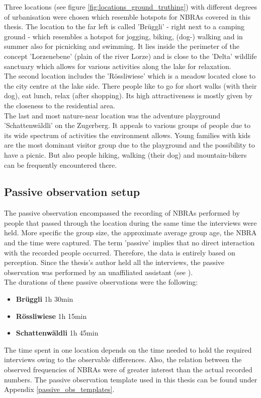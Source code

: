 Three locations (see figure \ref{fig:locations_ground_truthing}) with different degrees of urbanisation were chosen which resemble hotspots for NBRAs covered in this thesis. The location to the far left is called 'Br\"uggli' - right next to a camping ground - which resembles a hotspot for jogging, biking, (dog-) walking and in summer also for picnicking and swimming. It lies inside the perimeter of the concept 'Lorzenebene' (plain of the river Lorze) and is close to the 'Delta' wildlife sanctuary which allows for various activities along the lake for relaxation.\\
The second location includes the 'R\"ossliwiese' which is a meadow located close to the city centre at the lake side. There people like to go for short walks (with their dog), eat lunch, relax (after shopping). Its high attractiveness is mostly given by the closeness to the residential area.\\
The last and most nature-near location was the adventure playground 'Schattenw\"aldli' on the Zugerberg. It appeals to various groups of people due to its wide spectrum of activities the environment allows. Young families with kids are the most dominant visitor group due to the playground and the possibility to have a picnic. But also people hiking, walking (their dog) and mountain-bikers can be frequently encountered there.

\subsection{Passive observation setup} \label{passive_observation_setup}
The passive observation encompassed the recording of NBRAs performed by people that passed through the location during the same time the interviews were held. More specific the group size, the approximate average group age, the NBRA and the time were captured. The term 'passive' implies that no direct interaction with the recorded people occurred. Therefore, the data is entirely based on perception.
Since the thesis's author held all the interviews, the passive observation was performed by an unaffiliated assistant (see ).\\
The durations of these passive observations were the following:
\begin{itemize}
    \item \textbf{Br\"uggli} 1h 30min
    \item \textbf{R\"ossliwiese} 1h 15min
    \item \textbf{Schattenw\"aldli} 1h 45min
\end{itemize}
The time spent in one location depends on the time needed to hold the required interviews owing to the observable differences. Also, the relation between the observed frequencies of NBRAs were of greater interest than the actual recorded numbers.
The passive observation template used in this thesis can be found under Appendix \ref{passive_obs_templates}.

